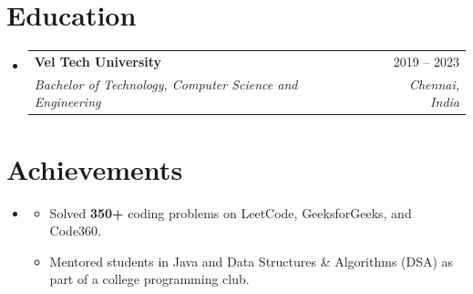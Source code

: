 \documentclass[letterpaper,11pt]{article}
\makeatletter
\newcommand{\resumeItem}[1]{
  \item\small{#1 \vspace{-2pt}}
}
\newcommand{\resumeSubheading}[4]{
  \vspace{-2pt}\item
    \begin{tabular*}{0.97\textwidth}[t]{l@{\extracolsep{\fill}}r}
      \textbf{#1} & #2 \\
      \textit{\small#3} & \textit{\small #4} \\
    \end{tabular*}\vspace{-7pt}
}
\newcommand{\resumeSubHeadingListStart}{\begin{itemize}[leftmargin=0.15in, label={}]}
\newcommand{\resumeSubHeadingListEnd}{\end{itemize}}
\newcommand{\resumeItemListStart}{\begin{itemize}}
\newcommand{\resumeItemListEnd}{\end{itemize}\vspace{-5pt}}
\makeatother
\begin{document}
\section{Education}
  \resumeSubHeadingListStart
    \resumeSubheading
      {Vel Tech University}{2019 -- 2023}
      {Bachelor of Technology, Computer Science and Engineering \normalfont{$|$ CGPA: 8.6/10}}{Chennai, India}
  \resumeSubHeadingListEnd

\section{Achievements}
  \resumeSubHeadingListStart
    \item
    \resumeItemListStart
      \resumeItem{Solved \textbf{350+} coding problems on LeetCode, GeeksforGeeks, and Code360.}
      \resumeItem{Mentored students in Java and Data Structures \& Algorithms (DSA) as part of a college programming club.}
    \resumeItemListEnd
  \resumeSubHeadingListEnd
\end{document}
